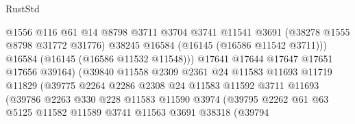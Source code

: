 \begin{lexlean}{RustStd}
\begin{coremodule}
                                      @1556
                                      @116
                                      @61
                                      @14
                                      @8798
                                      @3711
                                      @3704
                                      @3741
                                      @11541
                                      @3691
                                      (@38278 @1555 @8798 @31772 @31776)
                                      @38245
                                      @16584
                                      (@16145 (@16586 @11542 @3711)))
                                    @16584
                                    (@16145 (@16586 @11532 @11548)))
                                  @17641
                                  @17644
                                  @17647
                                  @17651
                                  @17656
                                  @39164)
                                (@39840
                                  @11558
                                  @2309
                                  @2361
                                  @24
                                  @11583
                                  @11693
                                  @11719
                                  @11829
                                  (@39775
                                    @2264
                                    @2286
                                    @2308
                                    @24
                                    @11583
                                    @11592
                                    @3711
                                    @11693
                                    (@39786
                                      @2263
                                      @330
                                      @228
                                      @11583
                                      @11590
                                      @3974
                                      (@39795
                                        @2262
                                        @61
                                        @63
                                        @5125
                                        @11582
                                        @11589
                                        @3741
                                        @11563
                                        @3691
                                        @38318
                                        (@39794

\end{coremodule}
\end{lexlean}
